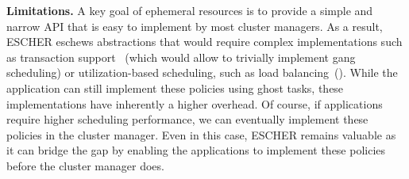 \noindent\textbf{Limitations.} 
A key goal of ephemeral resources is to provide a simple and narrow API that is easy to implement by most cluster managers. As a result, ESCHER eschews abstractions that would require complex implementations such as transaction support~\cite{omega} (which would allow to trivially implement gang scheduling) or utilization-based scheduling, such as load balancing~().     
While the application can still implement these policies using ghost tasks, these implementations have inherently a higher overhead. 
Of course, if applications require higher scheduling performance, we can eventually implement these policies in the cluster manager. Even in this case, ESCHER remains valuable as it can bridge the gap by enabling the applications to implement these policies before the cluster manager does.


